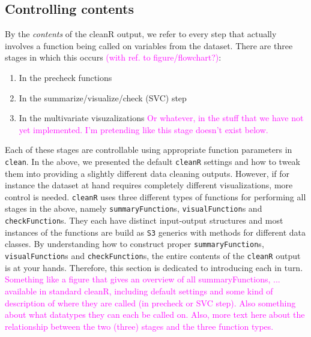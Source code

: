 \documentclass[article]{jss}
\newcommand{\hl}[1]{\textcolor{magenta}{#1}}
\newcommand{\R}[1]{\texttt{#1}}
\begin{document}
\subsection{Controlling contents}
By the \textit{contents} of the cleanR output, we refer to every step that actually involves a function being called on variables from the dataset. There are three stages in which this occurs \hl{(with ref. to figure/flowchart?)}:
\begin{enumerate}
\item In the precheck functions
\item In the summarize/visualize/check (SVC) step
\item In the multivariate visuzalizations \hl{Or whatever, in the stuff that we have not yet implemented. I'm pretending like this stage doesn't exist below.}
\end{enumerate}
Each of these stages are controllable using appropriate function parameters in \R{clean}. In the above, we presented the default \R{cleanR} settings and how to tweak them into providing a slightly different data cleaning outputs. However, if for instance the dataset at hand requires completely different visualizations, more control is needed. \R{cleanR} uses three different types of functions for performing all stages in the above, namely \R{summaryFunction}s, \R{visualFunction}s and \R{checkFunction}s. They each have distinct input-output structures and most instances of the functions are build as \R{S3} generics with methods for different data classes. By understanding how to construct proper \R{summaryFunction}s, \R{visualFunction}s and \R{checkFunction}s, the entire contents of the \R{cleanR} output is at your hands. Therefore, this section is dedicated to introducing each in turn.\\

\hl{Something like a figure that gives an overview of all summaryFunctions, ... available in standard cleanR, including default settings and some kind of description of where they are called (in precheck or SVC step). Also something about what datatypes they can each be called on. Also, more text here about the relationship between the two (three) stages and the three function types.}
\end{document}
